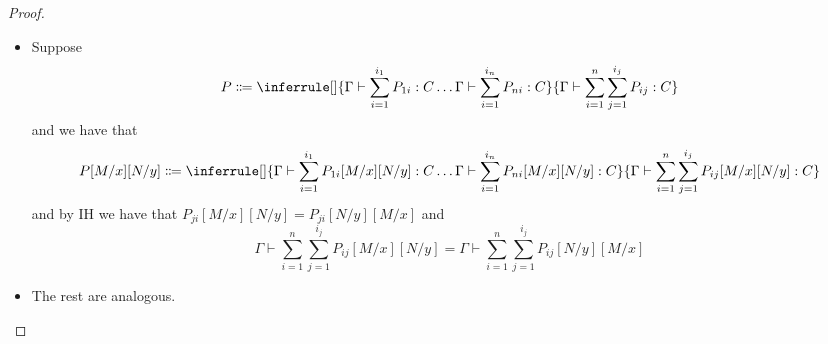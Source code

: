 \begin{proof}
\begin{itemize}
\begin{gather*}
{          }{
            \Gamma_1, \ldots, \Gamma_n \vdash \sum_{k_1=1}^{j_1}\ldots\sum_{k_n=1}^{i_n}f(P_{1k_1},\ldots,P_{nk_{n}}): C
          }
      \end{gather*}
      It must be that $x : A$ appears in $\Gamma_w$ and $y : B$ appears in $\Gamma_u$. If $w = u$ we simply apply IH to $\Gamma_w \vdash \sum_{j=1}^{i_w}P_{wj}$.
      Otherwise, we have
      \begin{align*}
      P[M/x][N/y] &= \Gamma_1, \ldots, \Gamma_n \vdash \sum_{k_1=1}^{j_1}\ldots\sum_{k_n=1}^{i_n}f(P_{1k_1},\ldots, P_{wk_w}[M/x],\ldots, P_{uk_{w}}[N/y] ,\ldots,P_{nk_{n}}): C\\
                  &= P[N/y][M/x]
      \end{align*}
    \item Suppose
    \begin{gather*}
      P \Coloneqq \inferrule[]{\Gamma \vdash \sum_{i=1}^{i_1}P_{1i} : C \ldots \Gamma \vdash \sum_{i=1}^{i_n}P_{ni} : C}{\Gamma \vdash \sum_{i=1}^{n}\sum_{j=1}^{i_j}P_{ij} : C}
    \end{gather*}
    and we have that 
    \begin{gather*}
      P[M/x][N/y] \Coloneqq \inferrule[]{\Gamma \vdash \sum_{i=1}^{i_1}P_{1i}[M/x][N/y] : C \ldots \Gamma \vdash \sum_{i=1}^{i_n}P_{ni}[M/x][N/y] : C}{\Gamma \vdash \sum_{i=1}^{n}\sum_{j=1}^{i_j}P_{ij}[M/x][N/y] : C}
    \end{gather*}
    and by IH we have that $P_{ji}[M/x][N/y] = P_{ji}[N/y][M/x]$ and 
    \[
      \Gamma \vdash \sum_{i=1}^{n}\sum_{j=1}^{i_j}P_{ij}[M/x][N/y] = \Gamma \vdash \sum_{i=1}^{n}\sum_{j=1}^{i_j}P_{ij}[N/y][M/x]
    \] 
    \item The rest are analogous.
  \end{itemize}
\end{proof}


